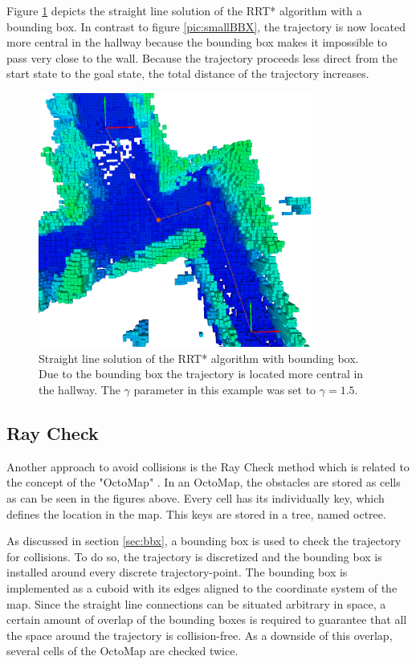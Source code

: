 Figure \ref{pic:bbx} depicts the straight line solution of the RRT* algorithm with a bounding box. In contrast to figure \ref{pic:smallBBX}, the trajectory is now located more central in the hallway because the bounding box makes it impossible to pass very close to the wall. Because the trajectory proceeds less direct from the start state to the goal state, the total distance of the trajectory increases. 

\begin{figure}[H]
   \centering
   \includegraphics[trim = 50mm 0mm 30mm 0mm,clip,width=0.8\textwidth]{pics/largeBBXP.png}
   \caption{Straight line solution of the RRT* algorithm with bounding box. Due to the bounding box the trajectory is located more central in the hallway. The $\gamma$ parameter in this example was set to $\gamma = 1.5$.}
   \label{pic:bbx}
\end{figure}

\subsection{Ray Check}\label{sec:RayCheck}

Another approach to avoid collisions is the Ray Check method which is related to the concept of the "OctoMap" \cite{OctoMap}. In an OctoMap, the obstacles are stored as cells as can be seen in the figures above. Every cell has its individually key, which defines the location in the map. This keys are stored in a tree, named octree.\newline

As discussed in section \ref{sec:bbx}, a bounding box is used to check the trajectory for collisions. To do so, the trajectory is discretized and the bounding box is installed around every discrete trajectory-point. The bounding box is implemented as a cuboid with its edges aligned to the coordinate system of the map. Since the straight line connections can be situated arbitrary in space, a certain amount of overlap of the bounding boxes is required to guarantee that all the space around the trajectory is collision-free. As a downside of this overlap, several cells of the OctoMap are checked twice.\newline

